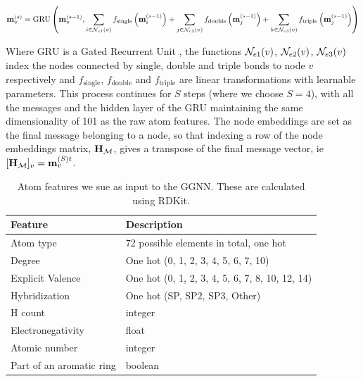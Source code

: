 \begin{align}
	{\mathbf{m}}_v^{(s)} = \textrm{GRU}\left( 
					{\mathbf{m}}_v^{(s - 1)},  
						\sum_{i \in \mathcal{N}_{e1}(v)} f_\textrm{single}\left({\mathbf{m}}_i^{(s - 1)}\right) +
						\sum_{j \in \mathcal{N}_{e2}(v)} f_\textrm{double}\left({\mathbf{m}}_j^{(s - 1)}\right) +
						\sum_{k \in \mathcal{N}_{e3}(v)} f_\textrm{triple}\left({\mathbf{m}}_j^{(s - 1)}\right)
					\right)
\end{align}

Where $\textrm{GRU}$ is a Gated Recurrent Unit \citep{Cho2014-xt}, the functions $\mathcal{N}_{e1}(v)$, $\mathcal{N}_{e2}(v)$, $\mathcal{N}_{e3}(v)$ index the nodes connected by single, double and triple bonds to node $v$ respectively and $f_\textrm{single}$, $f_\textrm{double}$ and $f_\textrm{triple}$ are linear transformations with learnable parameters.
This process continues for $S$ steps (where we choose $S=4$), with all the messages and the hidden layer of the GRU maintaining the same dimensionality of 101 as the raw atom features.
The node embeddings are set as the final message belonging to a node, so that indexing a row of the node embeddings matrix, ${\mathbf{H}}_{{\mathcal{M}}}$, gives a transpose of the final message vector, ie $[{\mathbf{H}}_{{\mathcal{M}}}]_v = {\mathbf{m}}_v^{(S)t}$.

\begin{table}
  \caption{Atom features we sue as input to the GGNN. These are calculated using RDKit.}
  \label{table:atom-features}
  \centering
  \begin{tabular}{ll}
    \toprule
    Feature     & Description      \\
    \midrule
    Atom type & 72 possible elements in total, one hot  \\
    Degree     & One hot (0,   1,   2,   3,   4,   5,   6,   7,  10)  \\
    Explicit Valence     & One hot   (0,   1,   2,   3,   4,   5,   6,   7,   8,  10,  12,  14)    \\
    Hybridization & One hot (SP, SP2, SP3, Other) \\
    H count & integer \\
    Electronegativity & float \\
    Atomic number & integer \\
    Part of an aromatic ring & boolean\\
    \bottomrule
  \end{tabular}
\end{table}


